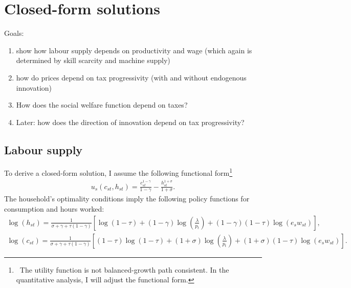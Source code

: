 \section{Closed-form solutions}
{Goals:
\begin{enumerate}
\item show how labour supply depends on productivity and wage (which again is determined by skill scarcity and machine supply) \checkmark
\item how do prices depend on tax progressivity (with and without endogenous innovation)
\item How does the social welfare function depend on taxes?
\item Later: how does the direction of innovation depend on tax progressivity?
\end{enumerate}}

\subsection{Labour supply}
To derive a closed-form solution, I assume the following functional form\footnote{\ The utility function is not balanced-growth path consistent. In the quantitative analysis, I will adjust the functional form.}
\begin{align}
u_s(c_{st},h_{st})=
\frac{c_{st}^{1-\gamma}}{1-\gamma}-
\frac{h_{st}^{1+\sigma}}{1+\sigma}.%
\end{align}
The household's optimality conditions imply the following policy functions for consumption and hours worked:
\begin{align}
\log(h_{st})= \frac{1}{\sigma+\gamma+\tau(1-\gamma)}\left[\log(1-\tau)+(1-\gamma)\log\left(\frac{\lambda}{p_{t}}\right)+(1-\gamma)(1-\tau)\log(e_sw_{st})\right],\label{eq:labour_sup}\\
\log(c_{st})= \frac{1}{\sigma +\gamma +\tau(1-\gamma)}\left[(1-\tau)\log(1-\tau)+(1+\sigma)\log\left(\frac{\lambda}{p_{t}}\right)+(1+\sigma)(1-\tau)\log(e_sw_{st})\right].
\end{align}

